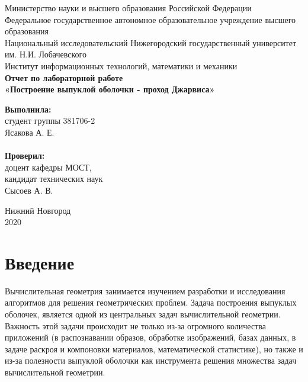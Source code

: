 \documentclass{report}
\begin{document}
\begin{titlepage}

\begin{center}
Министерство науки и высшего образования Российской Федерации \\
\vspace{5mm}
Федеральное государственное автономное образовательное учреждение высшего образования \\
Национальный исследовательский Нижегородский государственный университет им. Н.И. Лобачевского \\
\vspace{1cm}
Институт информационных технологий, математики и механики \\
\vspace{5cm}
\textbf{\large Отчет по лабораторной работе} \\
\vspace{8mm}
\textbf{\Large «Построение выпуклой оболочки - проход Джарвиса»} \\
\end{center}

\vspace{3cm}

\newbox{\lbox}
\newlength{\maxl}
\setlength{\maxl}{\wd\lbox}
\hfill\parbox{7cm}{
\hspace*{5cm}\hspace*{-5cm}\textbf{Выполнила:} \\ студент группы 381706-2 \\ Ясакова А. Е.\\
\\
\hspace*{5cm}\hspace*{-5cm}\textbf{Проверил:}\\ доцент кафедры МОСТ, \\ кандидат технических наук \\ Сысоев А. В.
}

\vspace{\fill}

\begin{center}
Нижний Новгород \\ 2020
\end{center}
\end{titlepage}

\setcounter{page}{2}

\tableofcontents

\newpage

\section{Введение}
Вычислительная геометрия занимается изучением разработки и исследования алгоритмов для решения геометрических проблем. Задача построения выпуклых оболочек, является одной из центральных задач вычислительной геометрии. Важность этой задачи происходит не только из-за огромного количества приложений (в распознавании образов, обработке изображений, базах данных, в задаче раскроя и компоновки материалов, математической статистике), но также и из-за полезности выпуклой оболочки как инструмента решения множества задач вычислительной геометрии.
\end{document}
